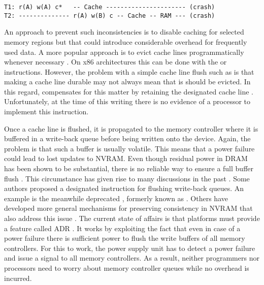 
\begin{lstlisting}
T1: r(A) w(A) c*   -- Cache ---------------------- (crash)
T2: -------------- r(A) w(B) c -- Cache -- RAM --- (crash)
\end{lstlisting}

An approach to prevent such inconsistencies is to disable caching for selected
memory regions but that could introduce considerable overhead for frequently
used data. A more popular approach is to evict cache lines programmatically
whenever necessary \cite{condit2009better, dulloor2014system, oukid2017data}. On
x86 architectures this can be done with the  or 
instructions. However, the problem with a simple cache line flush such as
 is that making a cache line durable may not always mean that is
should be evicted. In this regard,  compensates for this matter by
retaining the designated cache line \cite{kolli2016high}. Unfortunately, at the
time of this writing there is no evidence of a processor to implement this
instruction.


Once a cache line is flushed, it is propagated to the memory controller where it
is buffered in a write-back queue before being written onto the device. Again,
the problem is that such a buffer is usually volatile. This means that a power
failure could lead to lost updates to NVRAM. Even though residual power in DRAM
has been shown to be substantial, there is no reliable way to ensure a full
buffer flush \cite{halderman2008lest}. This circumstance has given rise to many
discussions in the past \cite{condit2009better, dulloor2014system,
kolli2016high}. Some authors proposed a designated instruction for flushing
write-back queues. An example is the meanwhile deprecated ,
formerly known as  \cite{dulloor2014system, oukid2015instant,
schwalb2015nvm_malloc, volos2017whisper}. Others have developed more general
mechanisms for preserving consistency in NVRAM that also address this issue
\cite{condit2009better, pelley2014memory}. The current state of affairs is
that platforms must provide a feature called ADR \cite{volos2017whisper}. It
works by exploiting the fact that even in case of a power failure there is
sufficient power to flush the write buffers of all memory controllers. For this
to work, the power supply unit has to detect a power failure and issue a signal
to all memory controllers. As a result, neither programmers nor processors need to worry about memory controller queues while no overhead is incurred.

